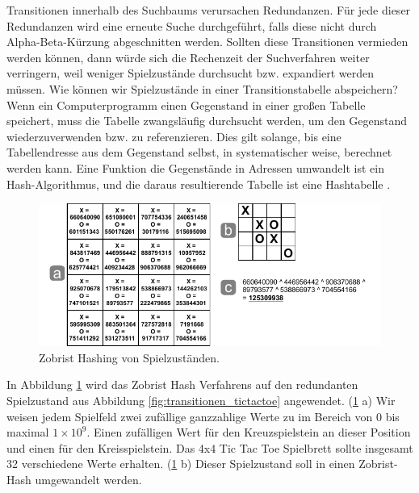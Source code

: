 Transitionen innerhalb des Suchbaums verursachen Redundanzen. Für jede dieser Redundanzen wird eine erneute Suche durchgeführt, falls diese nicht durch Alpha-Beta-Kürzung abgeschnitten werden. Sollten diese Transitionen vermieden werden können, dann würde sich die Rechenzeit der Suchverfahren weiter verringern, weil weniger Spielzustände durchsucht bzw. expandiert werden müssen. Wie können wir Spielzustände in einer Transitionstabelle abspeichern? \\

Wenn ein Computerprogramm einen Gegenstand in einer großen Tabelle speichert, muss die Tabelle zwangsläufig durchsucht werden, um den Gegenstand wiederzuverwenden bzw. zu referenzieren. Dies gilt solange, bis eine Tabellendresse aus dem Gegenstand selbst, in systematischer weise, berechnet werden kann. Eine Funktion die Gegenstände in Adressen umwandelt ist ein Hash-Algorithmus, und die daraus resultierende Tabelle ist eine Hashtabelle \cite[3]{Zobrist}. \\

\begin{figure}[!htbp]
  \centering
  \includegraphics[scale = 1.3]{inhalt/abbildungen/zobrist_hash_tictactoe.pdf}
  \caption{Zobrist Hashing von Spielzuständen.}
  \label{fig:zobrist_hash_tictactoe}
\end{figure} 


In Abbildung \ref{fig:zobrist_hash_tictactoe} wird das Zobrist Hash Verfahrens auf den redundanten Spielzustand aus Abbildung \ref{fig:transitionen_tictactoe} angewendet. (\ref{fig:zobrist_hash_tictactoe} a) Wir weisen jedem Spielfeld zwei zufällige ganzzahlige Werte zu im Bereich von 0 bis maximal $1 \times 10^{9}$. Einen zufälligen Wert für den Kreuzspielstein an dieser Position und einen für den Kreisspielstein. Das 4x4 Tic Tac Toe Spielbrett sollte insgesamt 32 verschiedene Werte erhalten. (\ref{fig:zobrist_hash_tictactoe} b) Dieser Spielzustand soll in einen Zobrist-Hash umgewandelt werden. \\

